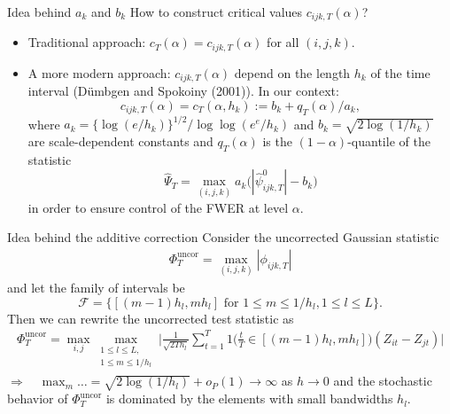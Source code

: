 \documentclass[10pt]{beamer}
\begin{document}
\begin{frame}[label = frame_constants]{Idea behind $a_k$ and $b_k$}
How to construct critical values $c_{ijk,T}(\alpha)$? \pause
\begin{itemize}
\item Traditional approach: $c_T(\alpha) = c_{ijk,T}(\alpha)$ for all $(i,j,k)$. \pause
\item A more modern approach: $c_{ijk,T}(\alpha)$ depend on the length $h_k$ of the time interval (D{\"u}mbgen and Spokoiny (2001)). In our context:
\begin{equation*}
c_{ijk,T}(\alpha) = c_T(\alpha,h_k) := b_k + q_T(\alpha)/a_k, 
\end{equation*}
where $a_k = \{\log(e/h_k)\}^{1/2} / \log \log(e^e / h_k)$ and $b_k = \sqrt{2 \log(1/h_k)}$ are scale-dependent constants and $q_T(\alpha)$ is the $(1-\alpha)$-quantile of the statistic 
\[ \hat{\Psi}_T = \max_{(i,j,k)} a_k \big( |\hat{\psi}_{ijk,T}^0| - b_k \big) \]
in order to ensure control of the FWER at level $\alpha$.
\end{itemize}
\hyperlink{frame_test<4>}{}
\end{frame}

\begin{frame}{Idea behind the additive correction}
Consider the uncorrected Gaussian statistic
\begin{align*}
\Phi_{T}^{\text{uncor}} = \max_{(i,j,k)} |\phi_{ijk, T}|
\end{align*}\pause
and let the family of intervals be \[\mathcal{F} = \big\{[(m-1) h_l, m h_l] \text{ for } 1\le m \le 1/h_l, 1 \le l \le L\big\}.\]\pause
Then we can rewrite the uncorrected test statistic as
\begin{align*}
\Phi_{T}^{\text{uncor}} = \max_{i, j} \max_{\substack{1 \le l \le L, \\ 1\le m \le 1/h_l}} \Big|\frac{1}{\sqrt{2 T h_l}} \sum\limits_{t=1}^T 1 \Big( \frac{t}{T} \in [(m-1) h_l, m h_l] \Big) (Z_{it} - Z_{jt})\Big|
\end{align*}\pause
$\Rightarrow \quad \max_m \ldots =\sqrt{2\log(1/h_l)} + o_P(1) \to \infty$ as $h \to 0$ and the stochastic behavior of $\Phi_{T}^{\text{uncor}}$ is dominated by the elements with small bandwidths $h_l$. \hyperlink{frame_test<4>}{}
\end{frame}
\end{document}
